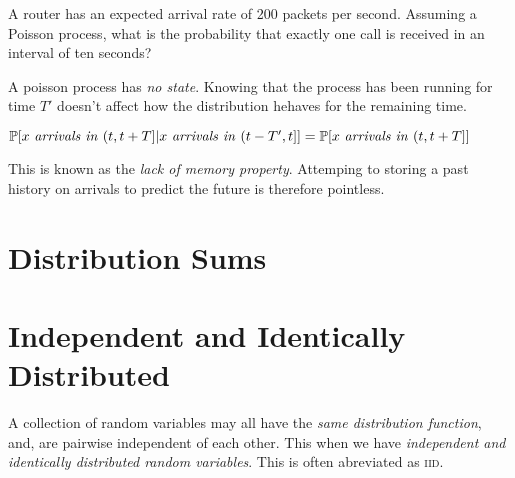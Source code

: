 \frmrule

\begin{example}
A router has an expected arrival rate of 200 packets per second.
Assuming a Poisson process, what is the probability that exactly
one call is received in an interval of ten seconds?
\end{example}




\frmrule

A poisson process has \textit{no state}. 
Knowing that the process has been running for time $T'$ doesn’t
affect how the distribution hehaves for the remaining time.

$\mathbb{P}[x \text{ \textit{arrivals in} } (t,t+T] | 
x \text{ \textit{arrivals in} } (t-T',t]]
= \mathbb{P}[x \text{ \textit{arrivals in} } (t,t+T]]$

This is known as the \textit{lack of memory property}. 
Attemping to storing a past history on arrivals to predict 
the future is therefore pointless. 


\section{Distribution Sums}




\section{Independent and Identically Distributed}


A collection of random variables may all have the 
\textit{same distribution function}, and, are pairwise independent 
of each other. This when we have \textit{independent and identically 
distributed random variables}. This is often abreviated as \textsc{iid}.




